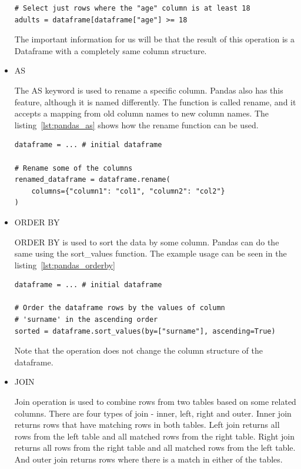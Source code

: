 \begin{itemize}
\begin{lstlisting}[caption=Where in Pandas, label={lst:pandas_where}, captionpos=b]
# Select just rows where the "age" column is at least 18
adults = dataframe[dataframe["age"] >= 18
    \end{lstlisting}
    The important information for us will be that the result of this operation is a Dataframe with a completely same
    column structure.

    \item AS

    The AS keyword is used to rename a specific column.
    Pandas also has this feature, although it is named differently.
    The function is called rename, and it accepts a mapping from old column names to new column names.
    The listing~\ref{lst:pandas_as} shows how the rename function can be used.

    \begin{lstlisting}[caption=As in Pandas, label={lst:pandas_as}, captionpos=b]
dataframe = ... # initial dataframe

# Rename some of the columns
renamed_dataframe = dataframe.rename(
    columns={"column1": "col1", "column2": "col2"}
)
    \end{lstlisting}

    \item ORDER BY

    ORDER BY is used to sort the data by some column.
    Pandas can do the same using the sort\_values function.
    The example usage can be seen in the listing~\ref{lst:pandas_orderby}

    \begin{lstlisting}[caption=Order by in Pandas, label={lst:pandas_orderby}, captionpos=b]
dataframe = ... # initial dataframe

# Order the dataframe rows by the values of column
# 'surname' in the ascending order
sorted = dataframe.sort_values(by=["surname"], ascending=True)
    \end{lstlisting}
    Note that the operation does not change the column structure of the dataframe.

    \item JOIN

    Join operation is used to combine rows from two tables based on some related columns.
    There are four types of join - inner, left, right and outer.
    Inner join returns rows that have matching rows in both tables.
    Left join returns all rows from the left table and all matched rows from the right table.
    Right join returns all rows from the right table and all matched rows from the left table.
    And outer join returns rows where there is a match in either of the tables.


\end{itemize}
